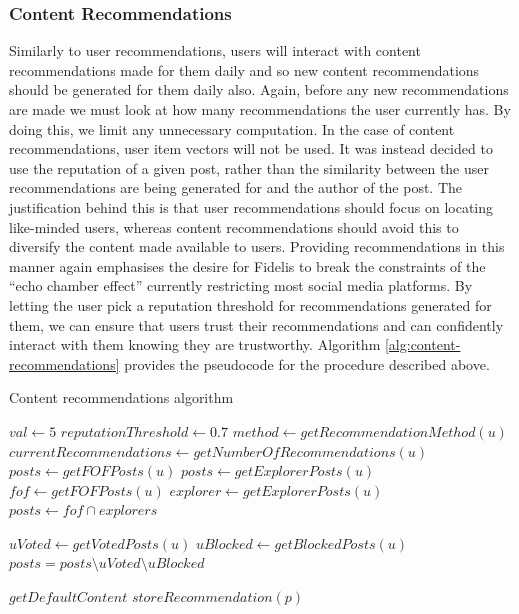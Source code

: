 \subsubsection{Content Recommendations}
\label{sec:content-recommendations}
Similarly to user recommendations, users will interact with content recommendations made for them daily and so new content recommendations should be generated for them daily also. Again, before any new recommendations are made we must look at how many recommendations the user currently has. By doing this, we limit any unnecessary computation. In the case of content recommendations, user item vectors will not be used. It was instead decided to use the reputation of a given post, rather than the similarity between the user recommendations are being generated for and the author of the post. The justification behind this is that user recommendations should focus on locating like-minded users, whereas content recommendations should avoid this to diversify the content made available to users. Providing recommendations in this manner again emphasises the desire for Fidelis to break the constraints of the ``echo chamber effect'' currently restricting most social media platforms. By letting the user pick a reputation threshold for recommendations generated for them, we can ensure that users trust their recommendations and can confidently interact with them knowing they are trustworthy. Algorithm \ref{alg:content-recommendations} provides the pseudocode for the procedure described above. 

\begin{algorithm}
\caption{Content recommendations algorithm}
\label{alg:content-recommendations}
\begin{algorithmic}[1]
\State $val\gets 5$
\State $reputationThreshold\gets 0.7$
	\State $method\gets getRecommendationMethod(u)$
	\State $currentRecommendations\gets getNumberOfRecommendations(u)$
			\State $posts\gets getFOFPosts(u)$
		\EndIf
			\State $posts\gets getExplorerPosts(u)$
		\EndIf
			\State $fof\gets getFOFPosts(u)$
			\State $explorer\gets getExplorerPosts(u)$
			\State $posts\gets fof \cap explorers$
		\EndIf
		
		\State $uVoted\gets getVotedPosts(u)$
		\State $uBlocked\gets getBlockedPosts(u)$
		\State $posts = posts \setminus uVoted \setminus uBlocked$
		
			\State $getDefaultContent$
		\Else
					\State $storeRecommendation(p)$
				\EndIf
			\EndFor
		\EndIf
	\EndIf
\EndFor
\end{algorithmic}
\end{algorithm}

